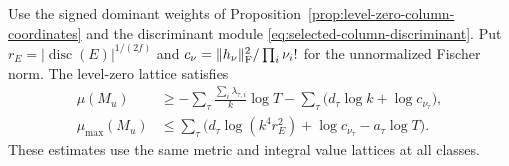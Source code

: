 \begin{proposition}\label{prop:level-zero-column-slopes}
Use the signed dominant weights of
Proposition~\ref{prop:level-zero-column-coordinates} and the
discriminant module \eqref{eq:selected-column-discriminant}.
Put \(r_E=|\operatorname{disc}(E)|^{1/(2f)}\) and
\(c_\nu=\|h_\nu\|_{\rm F}^2/\prod_i\nu_i!\) for the
unnormalized Fischer norm. The level-zero lattice satisfies
\[
\begin{aligned}
 \mu(M_u)&\ge -\sum_\tau\frac{\sum_i\lambda_{\tau,i}}{k}\log T
       -\sum_\tau\bigl(d_\tau\log k+\log c_{\nu_\tau}\bigr),\\
 \mu_{\max}(M_u)&\le
    \sum_\tau\bigl(d_\tau\log(k^4r_E^2)+
         \log c_{\nu_\tau}-a_\tau\log T\bigr).
\end{aligned}
\]
These estimates use the same metric and integral value lattices
at all classes.
\end{proposition}

